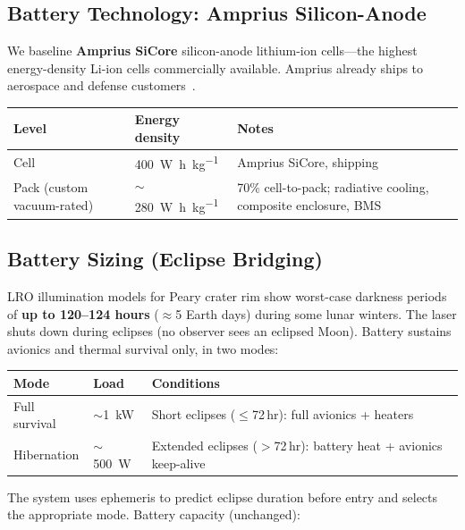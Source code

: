 \documentclass[12pt,letterpaper]{article}
\begin{document}
\subsection{Battery Technology: Amprius Silicon-Anode}

We baseline \textbf{Amprius SiCore} silicon-anode lithium-ion cells---the
highest energy-density Li-ion cells commercially available. Amprius already
ships to aerospace and defense customers~\cite{Amprius}.

\begin{center}
\begin{tabular}{llp{5cm}}
\toprule
\textbf{Level} & \textbf{Energy density} & \textbf{Notes} \\
\midrule
Cell & \SI{400}{\watt\hour\per\kilo\gram} & Amprius SiCore, shipping \\
Pack (custom vacuum-rated) & $\sim$\SI{280}{\watt\hour\per\kilo\gram} & 70\% cell-to-pack; radiative cooling, composite enclosure, BMS \\
\bottomrule
\end{tabular}
\end{center}

\subsection{Battery Sizing (Eclipse Bridging)}

LRO illumination models for Peary crater rim show worst-case darkness periods of
\textbf{up to 120--124 hours} ($\approx$5 Earth days) during some lunar winters.
The laser shuts down during eclipses (no observer sees an eclipsed Moon). Battery
sustains avionics and thermal survival only, in two modes:

\begin{center}
\begin{tabular}{lll}
\toprule
\textbf{Mode} & \textbf{Load} & \textbf{Conditions} \\
\midrule
Full survival & $\sim$\SI{1}{\kilo\watt} & Short eclipses ($\leq$72\,hr): full avionics + heaters \\
Hibernation & $\sim$\SI{500}{\watt} & Extended eclipses ($>$72\,hr): battery heat + avionics keep-alive \\
\bottomrule
\end{tabular}
\end{center}

The system uses ephemeris to predict eclipse duration before entry and selects the
appropriate mode. Battery capacity (unchanged):
\end{document}
